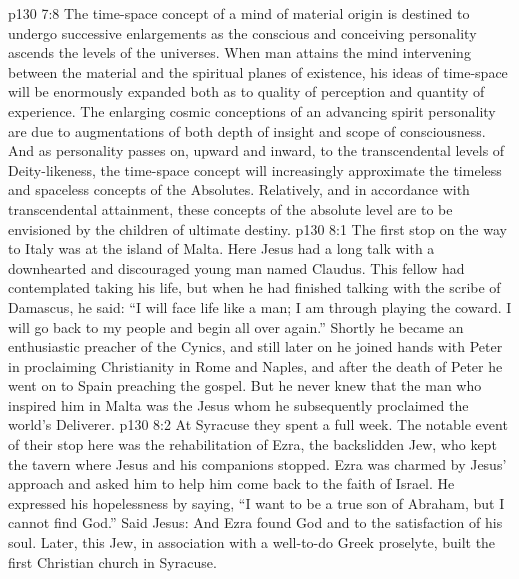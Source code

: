 \vs p130 7:8 \pc The time\hyp{}space concept of a mind of material origin is destined to undergo successive enlargements as the conscious and conceiving personality ascends the levels of the universes. When man attains the mind intervening between the material and the spiritual planes of existence, his ideas of time\hyp{}space will be enormously expanded both as to quality of perception and quantity of experience. The enlarging cosmic conceptions of an advancing spirit personality are due to augmentations of both depth of insight and scope of consciousness. And as personality passes on, upward and inward, to the transcendental levels of Deity\hyp{}likeness, the time\hyp{}space concept will increasingly approximate the timeless and spaceless concepts of the Absolutes. Relatively, and in accordance with transcendental attainment, these concepts of the absolute level are to be envisioned by the children of ultimate destiny.
\vs p130 8:1 The first stop on the way to Italy was at the island of Malta. Here Jesus had a long talk with a downhearted and discouraged young man named Claudus. This fellow had contemplated taking his life, but when he had finished talking with the scribe of Damascus, he said: “I will face life like a man; I am through playing the coward. I will go back to my people and begin all over again.” Shortly he became an enthusiastic preacher of the Cynics, and still later on he joined hands with Peter in proclaiming Christianity in Rome and Naples, and after the death of Peter he went on to Spain preaching the gospel. But he never knew that the man who inspired him in Malta was the Jesus whom he subsequently proclaimed the world’s Deliverer.
\vs p130 8:2 \pc At Syracuse they spent a full week. The notable event of their stop here was the rehabilitation of Ezra, the backslidden Jew, who kept the tavern where Jesus and his companions stopped. Ezra was charmed by Jesus’ approach and asked him to help him come back to the faith of Israel. He expressed his hopelessness by saying, “I want to be a true son of Abraham, but I cannot find God.” Said Jesus:  And Ezra found God and to the satisfaction of his soul. Later, this Jew, in association with a well\hyp{}to\hyp{}do Greek proselyte, built the first Christian church in Syracuse.
